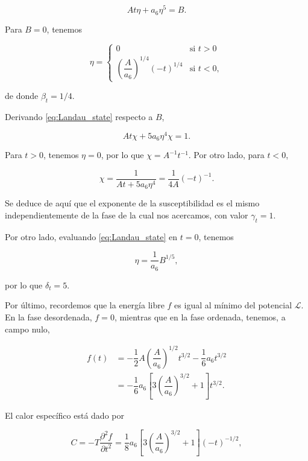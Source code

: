 \documentclass[10pt]{article}
\begin{document}
\begin{equation}\label{eq:Landau_state}
At\eta + a_6\eta^5 = B.
\end{equation}

Para $B=0$, tenemos

\[ \eta = \begin{cases} 
      0 & \text{si } t>	 0 \\
      \left(\dfrac{A}{a_6}\right)^{1/4} (-t)^{1/4} &\text{si } t< 0,
   \end{cases}
\]

de donde $\beta_t = 1/4$.

Derivando \ref{eq:Landau_state} respecto a $B$,

\begin{equation}
A t \chi + 5 a_6 \eta^4 \chi = 1.
\end{equation}

Para $t>0$, tenemos $\eta = 0$, por lo que $\chi = A^{-1} t^{-1}$. Por otro lado, para $t<0$,

\begin{equation}
\chi = \dfrac{1}{At + 5a_6\eta^4} = \dfrac{1}{4A} (-t)^{-1}.
\end{equation}

Se deduce de aqu\'i que el exponente de la susceptibilidad es el mismo independientemente de la fase de la cual nos acercamos, con valor $\gamma_t = 1$.

Por otro lado, evaluando \ref{eq:Landau_state} en $t = 0$, tenemos

\begin{equation}
\eta = \dfrac{1}{a_6} B^{1/5},
\end{equation}

por lo que $\delta_t = 5$.

Por \'ultimo, recordemos que la energ\'ia libre $f$ es igual al m\'inimo del potencial $\mathcal{L}$. En la fase desordenada, $f = 0$, mientras que en la fase ordenada, tenemos, a campo nulo,

\begin{align}
f(t) &= -\dfrac{1}{2} A \left( \dfrac{A}{a_6}\right)^{1/2} t^{3/2} - \dfrac{1}{6} a_6 t^{3/2}\\
&= -\dfrac{1}{6}a_6\left[3 \left( \dfrac{A}{a_6}\right)^{3/2} + 1\right] t^{3/2}.
\end{align}

El calor espec\'ifico est\'a dado por

\begin{equation}
C = -T \dfrac{\partial^2 f}{\partial t^2} = \dfrac{1}{8} a_6\left[3 \left( \dfrac{A}{a_6}\right)^{3/2} + 1\right] (-t)^{-1/2},
\end{equation}
\end{document}
